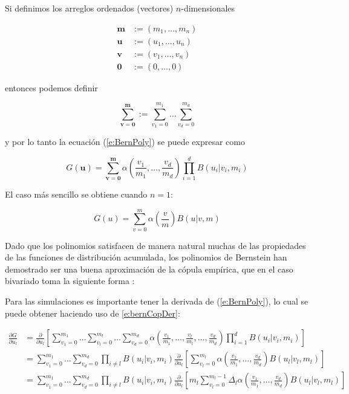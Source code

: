 Si definimos los arreglos ordenados (vectores) $n$-dimensionales

\begin{align}
	\mathbf{m} & := (m_1, \dots, m_n) \\
	\mathbf{u} & := (u_1, \ldots, u_n) \\
	\mathbf{v} & := (v_1, \ldots, v_n) \\
	\mathbf{0} & := (0, \ldots, 0)
\end{align}

entonces podemos definir

\begin{equation}
	\sum_{\mathbf{v} = \mathbf{0}}^{\mathbf{m}} := 
	\sum_{v_1 = 0}^{m_1} \dots \sum_{v_d = 0}^{m_d}
\end{equation}

y por lo tanto la ecuaci\'on (\ref{e:BernPoly}) se puede expresar como

\begin{equation}
	G(\mathbf{u}) =
	\sum_{\mathbf{v} = \mathbf{0}}^{\mathbf{m}}
	\alpha
	\left(
		\frac{v_1}{m_1}, \ldots, \frac{v_d}{m_d}
	\right)
	\prod_{i = 1}^{d} B(u_i|v_i,m_i)
\end{equation}

El caso m\'as sencillo se obtiene cuando $n=1$:

\begin{equation}
	G(u) = \sum_{v=0}^m
	\alpha
	\left(
		\frac{v}{m}
	\right)
	B(u|v,m)
\end{equation}

Dado que los polinomios satisfacen de manera natural muchas de las propiedades de las funciones de distribuci\'{o}n acumulada, los polinomios de Bernstein han demostrado ser una buena aproximaci\'{o}n de la c\'{o}pula emp\'{i}rica, que en el caso bivariado toma la siguiente forma \citep{deheuvels_fonction_1979}:

Para las simulaciones es importante tener la derivada de (\ref{e:BernPoly}), lo cual se puede obtener haciendo uso de \ref{e:bernCopDer}:  

\begin{align} \label{e:bernCopDer} %
	\frac{\partial G}{\partial u_l} &=
	\frac{\partial }{\partial u_l}
	\left[
		\sum_{v_1 = 0}^{m_1} \dots \sum_{v_l = 0}^{m_l}
		\dots \sum_{v_d = 0}^{m_d}
		\alpha
		\left(
			\frac{v_1}{m_1}, \ldots,
			\frac{v_l}{m_l}, \ldots,
			\frac{v_d}{m_d}
		\right)
		\prod_{i = 1}^{d} B(u_i|v_i,m_i)
	\right] \\
	&= 
		\sum_{v_1 = 0}^{m_1} \dots \sum_{v_d = 0}^{m_d}
		\prod_{i \ne l} B(u_i|v_i,m_i)
		\frac{\partial }{\partial u_l}
	\left[
		\sum_{v_l = 0}^{m_l}
		\alpha
		\left(
			\frac{v_1}{m_1}, \ldots,
			\frac{v_d}{m_d}
		\right)
		B(u_l|v_l,m_l)
	\right] \\
	&= 
		\sum_{v_1 = 0}^{m_1} \dots \sum_{v_d = 0}^{m_d}
		\prod_{i \ne l} B(u_i|v_i,m_i)
		\frac{\partial }{\partial u_l}
	\left[
		m_l
		\sum_{v_l = 0}^{m_l - 1}
		\Delta_l \alpha
		\left(
			\frac{v_1}{m_1}, \ldots,
			\frac{v_d}{m_d}
		\right)
		B(u_l|v_l,m_l)
	\right] 
\end{align}

